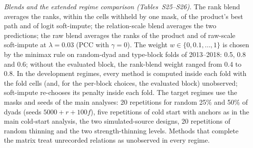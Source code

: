 \documentclass[journal]{IEEEtran}
\begin{document}
\emph{Blends and the extended regime comparison (Tables~S25--S26).} The rank blend averages the ranks, within the cells withheld by one mask, of the product's best path and of logit soft-impute; the relation-scale blend averages the two predictions; the raw blend averages the ranks of the product and of raw-scale soft-impute at $\lambda=0.03$ (PCC with $\gamma=0$). The weight $w\in\{0,0.1,\dots,1\}$ is chosen by the minimax rule on random-dyad and type-block folds of 2013--2018: 0.5, 0.8 and 0.6; without the evaluated block, the rank-blend weight ranged from 0.4 to 0.8. In the development regimes, every method is computed inside each fold with the fold cells (and, for the per-block choices, the evaluated block) unobserved; soft-impute re-chooses its penalty inside each fold. The target regimes use the masks and seeds of the main analyses: 20 repetitions for random 25\% and 50\% of dyads (seeds $5000+r+100f$), five repetitions of cold start with anchors as in the main cold-start analysis, the two simulated-source designs, 20 repetitions of random thinning and the two strength-thinning levels. Methods that complete the matrix treat unrecorded relations as unobserved in every regime.
\end{document}
